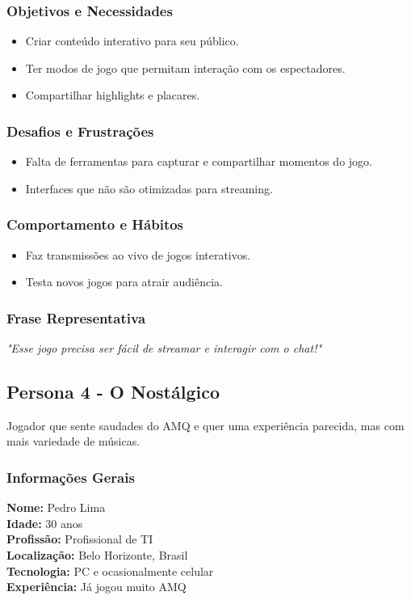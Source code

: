 \begin{titlepage}
    \subsubsection{Objetivos e Necessidades}
        \begin{itemize}
            \item Criar conteúdo interativo para seu público.
            \item Ter modos de jogo que permitam interação com os espectadores.
            \item Compartilhar highlights e placares.
        \end{itemize}

    \subsubsection{Desafios e Frustrações}
        \begin{itemize}
            \item Falta de ferramentas para capturar e compartilhar momentos do jogo.
            \item Interfaces que não são otimizadas para streaming.
        \end{itemize}

    \subsubsection{Comportamento e Hábitos}
        \begin{itemize}
            \item Faz transmissões ao vivo de jogos interativos.
            \item Testa novos jogos para atrair audiência.
        \end{itemize}
    
    \subsubsection{Frase Representativa}
        \textit{"Esse jogo precisa ser fácil de streamar e interagir com o chat!"}

    \subsection{Persona 4 - O Nostálgico}
    Jogador que sente saudades do AMQ e quer uma experiência parecida, mas com mais variedade de músicas.

    \subsubsection{Informações Gerais}
        \textbf{Nome:} Pedro Lima\\
        \textbf{Idade:} 30 anos\\
        \textbf{Profissão:} Profissional de TI\\
        \textbf{Localização:} Belo Horizonte, Brasil\\
        \textbf{Tecnologia:} PC e ocasionalmente celular\\
        \textbf{Experiência:} Já jogou muito AMQ\\


\end{titlepage}
